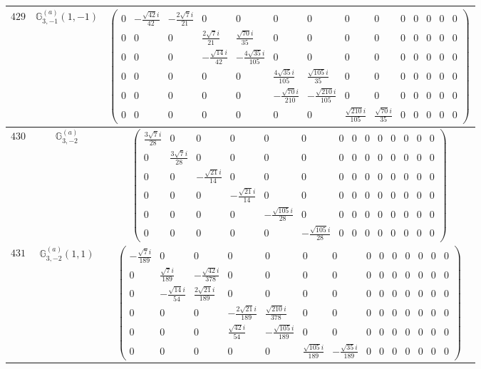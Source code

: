 \documentclass[fleqn,8pt,landscape]{jsarticle}
\begin{document}
\begin{center}
\begin{longtable}{ccc}
$ 429 $ & $ \mathbb{G}_{3,-1}^{(a)}(1,-1) $ & $ \begin{pmatrix} 0 & - \frac{\sqrt{42} i}{42} & - \frac{2 \sqrt{7} i}{21} & 0 & 0 & 0 & 0 & 0 & 0 & 0 & 0 & 0 & 0 & 0 \\ 0 & 0 & 0 & \frac{2 \sqrt{7} i}{21} & \frac{\sqrt{70} i}{35} & 0 & 0 & 0 & 0 & 0 & 0 & 0 & 0 & 0 \\ 0 & 0 & 0 & - \frac{\sqrt{14} i}{42} & - \frac{4 \sqrt{35} i}{105} & 0 & 0 & 0 & 0 & 0 & 0 & 0 & 0 & 0 \\ 0 & 0 & 0 & 0 & 0 & \frac{4 \sqrt{35} i}{105} & \frac{\sqrt{105} i}{35} & 0 & 0 & 0 & 0 & 0 & 0 & 0 \\ 0 & 0 & 0 & 0 & 0 & - \frac{\sqrt{70} i}{210} & - \frac{\sqrt{210} i}{105} & 0 & 0 & 0 & 0 & 0 & 0 & 0 \\ 0 & 0 & 0 & 0 & 0 & 0 & 0 & \frac{\sqrt{210} i}{105} & \frac{\sqrt{70} i}{35} & 0 & 0 & 0 & 0 & 0 \end{pmatrix} $ \\ \hline
$ 430 $ & $ \mathbb{G}_{3,-2}^{(a)} $ & $ \begin{pmatrix} \frac{3 \sqrt{7} i}{28} & 0 & 0 & 0 & 0 & 0 & 0 & 0 & 0 & 0 & 0 & 0 & 0 & 0 \\ 0 & \frac{3 \sqrt{7} i}{28} & 0 & 0 & 0 & 0 & 0 & 0 & 0 & 0 & 0 & 0 & 0 & 0 \\ 0 & 0 & - \frac{\sqrt{21} i}{14} & 0 & 0 & 0 & 0 & 0 & 0 & 0 & 0 & 0 & 0 & 0 \\ 0 & 0 & 0 & - \frac{\sqrt{21} i}{14} & 0 & 0 & 0 & 0 & 0 & 0 & 0 & 0 & 0 & 0 \\ 0 & 0 & 0 & 0 & - \frac{\sqrt{105} i}{28} & 0 & 0 & 0 & 0 & 0 & 0 & 0 & 0 & 0 \\ 0 & 0 & 0 & 0 & 0 & - \frac{\sqrt{105} i}{28} & 0 & 0 & 0 & 0 & 0 & 0 & 0 & 0 \end{pmatrix} $ \\ \hline
$ 431 $ & $ \mathbb{G}_{3,-2}^{(a)}(1,1) $ & $ \begin{pmatrix} - \frac{\sqrt{7} i}{189} & 0 & 0 & 0 & 0 & 0 & 0 & 0 & 0 & 0 & 0 & 0 & 0 & 0 \\ 0 & \frac{\sqrt{7} i}{189} & - \frac{\sqrt{42} i}{378} & 0 & 0 & 0 & 0 & 0 & 0 & 0 & 0 & 0 & 0 & 0 \\ 0 & - \frac{\sqrt{14} i}{54} & \frac{2 \sqrt{21} i}{189} & 0 & 0 & 0 & 0 & 0 & 0 & 0 & 0 & 0 & 0 & 0 \\ 0 & 0 & 0 & - \frac{2 \sqrt{21} i}{189} & \frac{\sqrt{210} i}{378} & 0 & 0 & 0 & 0 & 0 & 0 & 0 & 0 & 0 \\ 0 & 0 & 0 & \frac{\sqrt{42} i}{54} & - \frac{\sqrt{105} i}{189} & 0 & 0 & 0 & 0 & 0 & 0 & 0 & 0 & 0 \\ 0 & 0 & 0 & 0 & 0 & \frac{\sqrt{105} i}{189} & - \frac{\sqrt{35} i}{189} & 0 & 0 & 0 & 0 & 0 & 0 & 0 \end{pmatrix} $ \\ \hline

\end{longtable}
\end{center}
\end{document}
